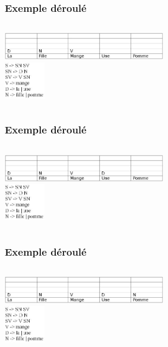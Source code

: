 \documentclass[table]{beamer}
\begin{document}
\begin{frame}
\frametitle{Exemple déroulé}
  \begin{columns}
  \begin{column}{0.6\textwidth}
     \includegraphics[width=200pt,]{4.jpeg}  \\
 
  \includegraphics[width=50pt,]{11.jpeg}  
  \end{column}
  \end{columns}
\end{frame}

\begin{frame}
\frametitle{Exemple déroulé}
  \begin{columns}
  \begin{column}{0.6\textwidth}
     \includegraphics[width=200pt,]{5.jpeg} \\ 
 
  \includegraphics[width=50pt,]{11.jpeg}  
  \end{column}
  \end{columns}
\end{frame}

\begin{frame}
\frametitle{Exemple déroulé}
  \begin{columns}
  \begin{column}{0.6\textwidth}
     \includegraphics[width=200pt,]{6.jpeg}  \\
 
  \includegraphics[width=50pt,]{11.jpeg}  
  \end{column}
  \end{columns}
\end{frame}
\end{document}
